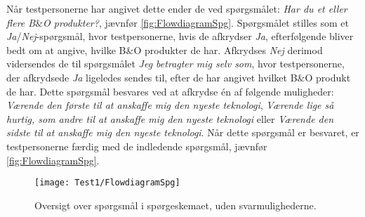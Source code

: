 Når testpersonerne har angivet dette ender de ved spørgsmålet: \textit{Har du et eller flere B$\&$O produkter?}, jævnfør \autoref{fig:FlowdiagramSpg}. Spørgsmålet stilles som et \textit{Ja}/\textit{Nej}-spørgsmål, hvor testpersonerne, hvis de afkrydser \textit{Ja}, efterfølgende bliver bedt om at angive, hvilke B$\&$O produkter de har. Afkrydses \textit{Nej} derimod vidersendes de til spørgsmålet \textit{Jeg betragter mig selv som}, hvor testpersonerne, der afkrydsede \textit{Ja} ligeledes sendes til, efter de har angivet hvilket B$\&$O produkt de har. Dette spørgsmål besvares ved at afkrydse én af følgende muligheder: \textit{Værende den første til at anskaffe mig den nyeste teknologi}, \textit{Værende lige så hurtig, som andre til at anskaffe mig den nyeste teknologi} eller \textit{Værende den sidste til at anskaffe mig den nyeste teknologi}. Når dette spørgsmål er besvaret, er testpersonerne færdig med de indledende spørgsmål, jævnfør \autoref{fig:FlowdiagramSpg}.
%
\begin{figure}[H]
	\centering
	\texttt{[image: Test1/FlowdiagramSpg]}
	\caption{Oversigt over spørgsmål i spørgeskemaet, uden svarmulighederne.}
	\label{fig:FlowdiagramSpg}
\end{figure}
\noindent
%